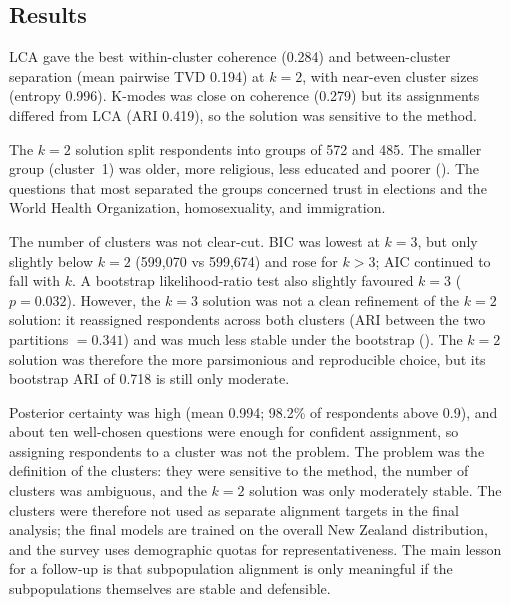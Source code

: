 \subsection{Results}

LCA gave the best within-cluster coherence (0.284) and between-cluster separation (mean pairwise TVD 0.194) at $k=2$, with near-even cluster sizes (entropy 0.996). K-modes was close on coherence (0.279) but its assignments differed from LCA (ARI 0.419), so the solution was sensitive to the method.

The $k=2$ solution split respondents into groups of 572 and 485. The smaller group (cluster~1) was older, more religious, less educated and poorer (). The questions that most separated the groups concerned trust in elections and the World Health Organization, homosexuality, and immigration.

The number of clusters was not clear-cut. BIC was lowest at $k=3$, but only slightly below $k=2$ (599{,}070 vs 599{,}674) and rose for $k>3$; AIC continued to fall with $k$. A bootstrap likelihood-ratio test \cite{mclachlanBootstrappingLikelihoodRatio1987,mclachlanFiniteMixtureModels2000} also slightly favoured $k=3$ ($p=0.032$). However, the $k=3$ solution was not a clean refinement of the $k=2$ solution: it reassigned respondents across both clusters (ARI between the two partitions $=0.341$) and was much less stable under the bootstrap (). The $k=2$ solution was therefore the more parsimonious and reproducible choice, but its bootstrap ARI of 0.718 is still only moderate.

Posterior certainty was high (mean 0.994; 98.2\% of respondents above 0.9), and about ten well-chosen questions were enough for confident assignment, so assigning respondents to a cluster was not the problem. The problem was the definition of the clusters: they were sensitive to the method, the number of clusters was ambiguous, and the $k=2$ solution was only moderately stable. The clusters were therefore not used as separate alignment targets in the final analysis; the final models are trained on the overall New Zealand distribution, and the survey uses demographic quotas for representativeness. The main lesson for a follow-up is that subpopulation alignment is only meaningful if the subpopulations themselves are stable and defensible.


